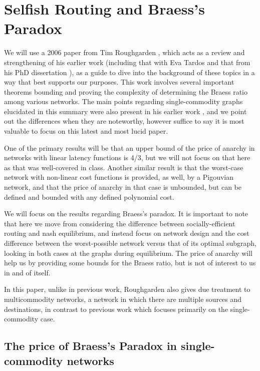 \documentclass[a4paper,12pt]{article}
\begin{document}
\section*{Selfish Routing and Braess's Paradox}

We will use a 2006 paper from Tim Roughgarden \cite{selfish}, which acts as a review and strengthening of his earlier work (including that with Eva Tardos \cite{tardos} and that from his PhD dissertation \cite{thesis}), as a guide to dive into the background of these topics in a way that best supports our purposes. This work involves several important theorems bounding and proving the complexity of determining the Braess ratio among various networks. The main points regarding single-commodity graphs elucidated in this summary were also present in his earlier work \cite{designing}, and we point out the differences when they are noteworthy, however suffice to say it is most valuable to focus on this latest and most lucid paper.

One of the primary results will be that an upper bound of the price of anarchy in networks with linear latency functions is 4/3, but we will not focus on that here as that was well-covered in class. Another similar result is that the worst-case network with non-linear cost functions is provided, as well, by a Pigouvian network, and that the price of anarchy in that case is unbounded, but can be defined and bounded with any defined polynomial cost.

We will focus on the results regarding Braess's paradox. It is important to note that here we move from considering the difference between socially-efficient routing and nash equilibrium, and instead focus on network design and the cost difference between the worst-possible network versus that of its optimal subgraph, looking in both cases at the graphs during equilibrium. The price of anarchy will help us by providing some bounds for the Braess ratio, but is not of interest to us in and of itself.

In this paper, unlike in previous work, Roughgarden also gives due treatment to multicommodity networks, a network in which there are multiple sources and destinations, in contrast to previous work which focuses primarily on the single-commodity case.

\subsection*{The price of Braess's Paradox in single-commodity networks}
\end{document}
